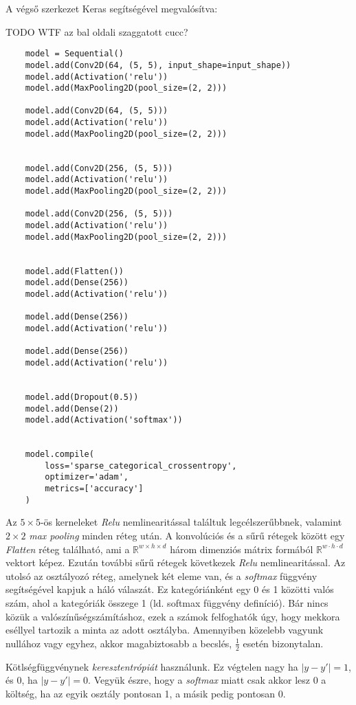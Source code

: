 A végső szerkezet Keras segítségével megvalósítva:

TODO WTF az bal oldali szaggatott cucc?

\lstset{language=Python}
\begin{lstlisting}  
	model = Sequential()
	model.add(Conv2D(64, (5, 5), input_shape=input_shape))
	model.add(Activation('relu'))
	model.add(MaxPooling2D(pool_size=(2, 2)))
	
	model.add(Conv2D(64, (5, 5)))
	model.add(Activation('relu'))
	model.add(MaxPooling2D(pool_size=(2, 2)))
	
	
	model.add(Conv2D(256, (5, 5)))
	model.add(Activation('relu'))
	model.add(MaxPooling2D(pool_size=(2, 2)))
	
	model.add(Conv2D(256, (5, 5)))
	model.add(Activation('relu'))
	model.add(MaxPooling2D(pool_size=(2, 2)))
	
	
	model.add(Flatten())
	model.add(Dense(256))
	model.add(Activation('relu'))
	
	model.add(Dense(256))
	model.add(Activation('relu'))
	
	model.add(Dense(256))
	model.add(Activation('relu'))
	
	
	model.add(Dropout(0.5))
	model.add(Dense(2))
	model.add(Activation('softmax'))
	
	
	model.compile(
		loss='sparse_categorical_crossentropy',
		optimizer='adam',
		metrics=['accuracy']
	) 

\end{lstlisting}


Az $ 5 \times 5 $-ös kerneleket \textit{Relu} nemlinearitással találtuk legcélszerűbbnek,
valamint $ 2 \times 2 $ \textit{max pooling} minden réteg után.
A konvolúciós és a sűrű rétegek között egy \textit{Flatten} réteg található,
ami a $ \mathbb{R}^{w \times h \times d} $ három dimenziós mátrix formából 
$ \mathbb{R}^{w \cdot h \cdot d} $ vektort képez. Ezután további sűrű rétegek
következek \textit{Relu} nemlinearitással. Az utolsó az osztályozó
réteg, amelynek két eleme van, és a \textit{softmax} függvény segítségével kapjuk
a háló válaszát. Ez kategóriánként egy 0 és 1 közötti valós szám, ahol a kategóriák 
összege 1 (ld. softmax függvény definíció). Bár nincs közük a valószínűségszámításhoz, 
ezek a számok felfoghatók úgy, hogy mekkora eséllyel tartozik a minta az adott osztályba.
Amennyiben közelebb vagyunk nullához vagy egyhez, akkor magabiztosabb a becslés, 
$ \frac{1}{2} $ esetén bizonytalan.

Kötlségfüggvénynek \textit{keresztentrópiát} használunk. Ez végtelen nagy ha $ |y-y'|=1 $,
és 0, ha $ |y-y'|=0 $. Vegyük észre, hogy a \textit{softmax} miatt csak akkor lesz 0
a költség, ha az egyik osztály pontosan 1, a másik pedig pontosan 0.

